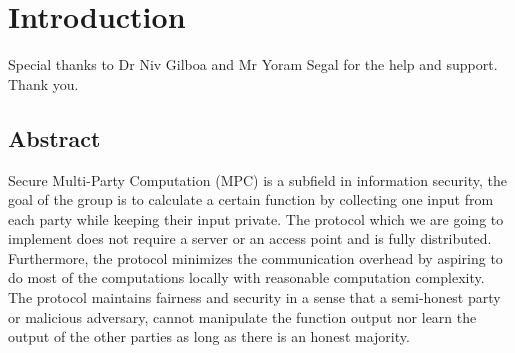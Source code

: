 \documentclass[12pt]{article}
\begin{document}
\section{Introduction}
Special thanks to Dr Niv Gilboa and Mr Yoram Segal for the help and \break support.\break\break
Thank you.
\subsection{Abstract}
Secure Multi-Party Computation (MPC) is a subfield in information security, the goal of the group is to calculate a certain function by collecting one input from each party while keeping their input private. The protocol which we are going to implement does not require a server or an access point and is fully distributed. Furthermore, the protocol minimizes the communication overhead by aspiring to do most of the computations locally with reasonable computation complexity.
The protocol maintains fairness and security in a sense that a semi-honest party or malicious adversary, cannot manipulate the function output nor learn the output of the other parties as long as there is an honest majority.\hfill\break\hfill\break
\end{document}

